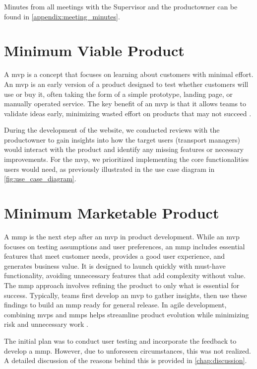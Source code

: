 Minutes from all meetings with the Supervisor and the \gls{productowner} can be found in \autoref{appendix:meeting_minutes}.

\section{Minimum Viable Product}

A \acrfull{mvp} is a concept that focuses on learning about customers with minimal effort. An \acrshort{mvp} is an early version of a product designed to test whether customers will use or buy it, often taking the form of a simple prototype, landing page, or manually operated service. The key benefit of an \acrshort{mvp} is that it allows teams to validate ideas early, minimizing wasted effort on products that may not succeed \cite{agile_alliance_mvp}. 

During the development of the website, we conducted reviews with the \gls{productowner} to gain insights into how the target users (transport managers) would interact with the product and identify any missing features or necessary improvements. For the \acrshort{mvp}, we prioritized implementing the core functionalities users would need, as previously illustrated in the use case diagram in \autoref{fig:use_case_diagram}.

\section{Minimum Marketable Product}

A \acrfull{mmp} is the next step after an \acrshort{mvp} in product development. While an \acrshort{mvp} focuses on testing assumptions and user preferences, an \acrshort{mmp} includes essential features that meet customer needs, provides a good user experience, and generates business value. It is designed to launch quickly with must-have functionality, avoiding unnecessary features that add complexity without value. The \acrshort{mmp} approach involves refining the product to only what is essential for success. Typically, teams first develop an \acrshort{mvp} to gather insights, then use these findings to build an \acrshort{mmp} ready for general release. In agile development, combining \acrshort{mvp}s and \acrshort{mmp}s helps streamline product evolution while minimizing risk and unnecessary work \cite{wanner_mmp}. 

The initial plan was to conduct user testing and incorporate the feedback to develop a \acrlong{mmp}. However, due to unforeseen circumstances, this was not realized. A detailed discussion of the reasons behind this is provided in \autoref{chap:discussion}.
